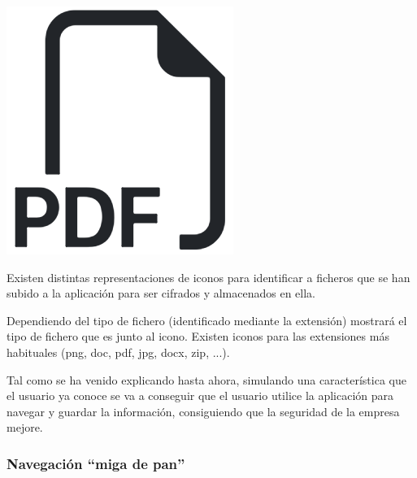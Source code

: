 \documentclass{\ClassPath/viu-tfm-template}
\begin{document}
{
    \begin{minipage}{0.1\linewidth}
        \includegraphics[width=\linewidth]{img/file.png}
    \end{minipage}
    \hfill
    \begin{minipage}{0.85\linewidth}
        Existen distintas representaciones de iconos para identificar a ficheros que se han subido a la aplicación para ser cifrados y almacenados en ella.

        Dependiendo del tipo de fichero (identificado mediante la extensión) mostrará el tipo de fichero que es junto al icono. Existen iconos para las extensiones más habituales (png, doc, pdf, jpg, docx, zip, ...).
    \end{minipage}
}

Tal como se ha venido explicando hasta ahora, simulando una característica que el usuario ya conoce se va a conseguir que el usuario utilice la aplicación para navegar y guardar la información, consiguiendo que la seguridad de la empresa mejore.


\subsubsection*{Navegación “miga de pan”}
\end{document}
